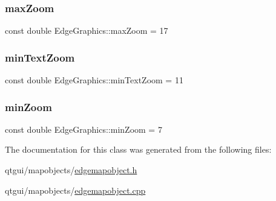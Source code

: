 \subsubsection{\texorpdfstring{maxZoom}{maxZoom}}
{\footnotesize\ttfamily const double Edge\+Graphics\+::max\+Zoom = 17\hspace{0.3cm}{\ttfamily [static]}}

\mbox{\label{class_edge_graphics_a482e4a1683f7c08759a834be14b4d741}} 
\subsubsection{\texorpdfstring{minTextZoom}{minTextZoom}}
{\footnotesize\ttfamily const double Edge\+Graphics\+::min\+Text\+Zoom = 11\hspace{0.3cm}{\ttfamily [static]}}

\mbox{\label{class_edge_graphics_a74066597dbde5c55a52435f0f5cd5561}} 
\subsubsection{\texorpdfstring{minZoom}{minZoom}}
{\footnotesize\ttfamily const double Edge\+Graphics\+::min\+Zoom = 7\hspace{0.3cm}{\ttfamily [static]}}



The documentation for this class was generated from the following files\+:\begin{DoxyCompactItemize}
\item 
qtgui/mapobjects/\mbox{\hyperlink{edgemapobject_8h}{edgemapobject.\+h}}\item 
qtgui/mapobjects/\mbox{\hyperlink{edgemapobject_8cpp}{edgemapobject.\+cpp}}\end{DoxyCompactItemize}
